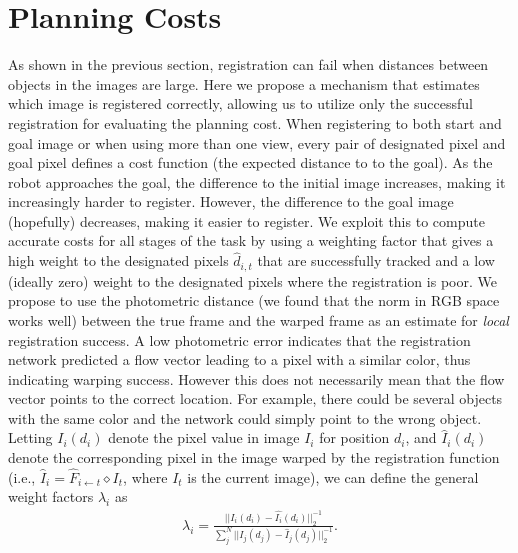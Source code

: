 \vspace{-0.1cm}
\section{Planning Costs}
\vspace{-0.2cm}

As shown in the previous section, registration can fail when distances between objects in the images are large. Here we propose a mechanism that estimates which image is registered correctly, allowing us to utilize only the successful registration for evaluating the planning cost.
When registering to both start and goal image or when using more than one view, 
every pair of designated pixel and goal pixel defines a cost function (the expected distance to to the goal). As the robot approaches the goal, the difference to the initial image increases, making it increasingly harder to register. However, the difference to the goal image (hopefully) decreases, making it easier to register.
We exploit this to compute accurate costs for all stages of the task by using a weighting factor that gives a high weight to the designated pixels $\hat{d}_{i,t}$ that are successfully tracked and a low (ideally zero) weight to the designated pixels where the registration is poor. We propose to use the photometric distance (we found that the norm in RGB space works well) between the true frame and the warped frame as an estimate for \emph{local} registration success. A low photometric error indicates that the registration network predicted a flow vector leading to a pixel with a similar color, thus indicating warping success. However this does not necessarily mean that the flow vector points to the correct location. For example, there could be several objects with the same color and the network could simply point to the wrong object. Letting $I_i(d_i)$ denote the pixel value in image $I_i$ for position $d_i$, and $\hat{I}_i(d_i)$ denote the corresponding pixel in the image warped by the registration function (i.e., $\hat{I}_i = \hat{F}_{i \leftarrow t} \diamond I_t$, where $I_t$ is the current image), we can define the general weight factors $\lambda_i$ as
\begin{align}
\lambda_i =  \frac{||I_i(d_i) - \hat{I_i}(d_i)||_2^{-1}}{\sum^N_j ||I_j(d_j) - \hat{I}_j(d_j)||^{-1}_2}.
\label{eqn:cost_avg}
\end{align}
